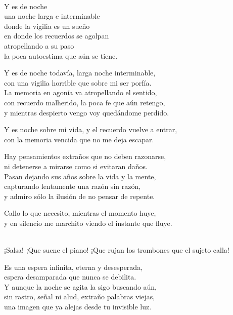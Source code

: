 \begin{lyrics}


\\
Y es de noche\\
una noche larga e interminable\\
donde la vigilia es un sueño\\
en donde los recuerdos se agolpan\\
atropellando a su paso\\
la poca autoestima que aún se tiene.

Y es de noche todavía, larga noche interminable,\\
con una vigilia horrible que sobre mi ser porfía.\\
La memoria en agonía va atropellando el sentido,\\
con recuerdo malherido, la poca fe que aún retengo,\\
y mientras despierto vengo voy quedándome perdido.

Y es noche sobre mi vida, y el recuerdo vuelve a entrar,\\
con la memoria vencida que no me deja escapar.


Hay pensamientos extraños que no deben razonarse,\\
ni detenerse a mirarse como si evitaran daños.\\
Pasan dejando sus años sobre la vida y la mente,\\
capturando lentamente una razón sin razón,\\
y admiro sólo la ilusión de no pensar de repente.

Callo lo que necesito, mientras el momento huye,\\
y en silencio me marchito viendo el instante que fluye.

\\
¡Salsa! ¡Que suene el piano! ¡Que rujan los trombones que el sujeto calla!\\

Es una espera infinita, eterna y desesperada,\\
espera desamparada que nunca se debilita.\\
Y aunque la noche se agita la sigo buscando aún,\\
sin rastro, señal ni alud, extraño palabras viejas,\\
una imagen que ya alejas desde tu invisible luz.


\end{lyrics}
